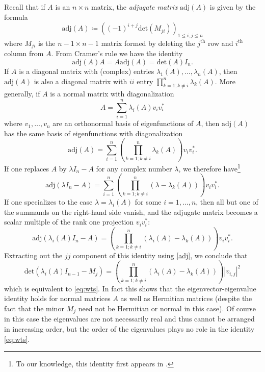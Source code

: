 \documentclass{amsart}
\begin{document}
Recall that if $A$ is an $n \times n$ matrix, the \emph{adjugate matrix} $\mathrm{adj}(A)$ is given by the formula
\begin{equation}\label{adj}
 \mathrm{adj}( A ) \coloneqq \left( (-1)^{i+j} \mathrm{det}(M_{ji}) \right)_{1 \leq i, j \leq n}
\end{equation}
where $M_{ji}$ is the $n-1 \times n-1$ matrix formed by deleting the $j^{\mathrm{th}}$ row and $i^{\mathrm{th}}$ column from $A$.  From Cramer's rule we have the identity
$$ \mathrm{adj}( A ) A = A \mathrm{adj}( A ) = \mathrm{det}(A) I_n.$$
If $A$ is a diagonal matrix with (complex) entries $\lambda_1(A),\dots,\lambda_n(A)$, then $\mathrm{adj}(A)$ is also a diagonal matrix with $ii$ entry $\prod_{k=1; k \neq i}^n \lambda_k(A)$.  More generally, if $A$ is a normal matrix with diagonalization
\begin{equation}\label{adiag}
 A = \sum_{i=1}^n \lambda_i(A) v_i v_i^*
\end{equation}
where $v_1,\dots,v_n$ are an orthonormal basis of eigenfunctions of $A$, then $\mathrm{adj}(A)$ has the same basis of eigenfunctions with diagonalization
\begin{equation}\label{adja}
 \mathrm{adj}(A) = \sum_{i=1}^n (\prod_{k=1; k \neq i}^n \lambda_k(A)) v_i v_i^*.
\end{equation}
If one replaces $A$ by $\lambda I_n - A$ for any complex number $\lambda$, we therefore have\footnote{To our knowledge, this identity first appears in \cite[p. 157]{halmos}.}
$$ \mathrm{adj}(\lambda I_n - A) = \sum_{i=1}^n (\prod_{k=1; k \neq i}^n (\lambda - \lambda_k(A)) ) v_i v_i^*.$$
If one specializes to the case $\lambda = \lambda_i(A)$ for some $i=1,\dots,n$, then all but one of the summands on the right-hand side vanish, and the adjugate matrix becomes a scalar multiple of the rank one projection $v_i v_i^*$:
\begin{equation}\label{adji}
\mathrm{adj}(\lambda_i(A) I_n - A) = (\prod_{k=1; k \neq i}^n (\lambda_i(A) - \lambda_k(A)) ) v_i v_i^*.
\end{equation}
Extracting out the $jj$ component of this identity using \eqref{adj}, we conclude that
\begin{equation}\label{adji-2}
 \mathrm{det}(\lambda_i(A) I_{n-1} - M_j) = (\prod_{k=1; k \neq i}^n (\lambda_i(A) - \lambda_k(A)) ) |v_{i,j}|^2
\end{equation}
which is equivalent to \eqref{eq:wts}.  In fact this shows that the eigenvector-eigenvalue identity holds for normal matrices $A$ as well as Hermitian matrices (despite the fact that the minor $M_j$ need not be Hermitian or normal in this case).  Of course in this case the eigenvalues are not necessarily real and thus cannot be arranged in increasing order, but the order of the eigenvalues plays no role in the identity \eqref{eq:wts}.
\end{document}
